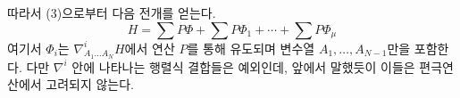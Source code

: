 
따라서 (3)으로부터 다음 전개를 얻는다.
\begin{equation}
  H=\sum P\Phi+\sum P\Phi_1+\cdots+\sum P\Phi_\mu
\tag{4}
\end{equation}
여기서 $\Phi_i$는 $\nabla^i_{A_1\ldots A_N}H$에서 연산 $P$를 통해 유도되며 변수열 $A_1,\ldots,A_{N-1}$만을 포함한다. 다만 $\nabla^i$ 안에 나타나는 행렬식 결합들은 예외인데, 앞에서 말했듯이 이들은 편극연산에서 고려되지 않는다.
